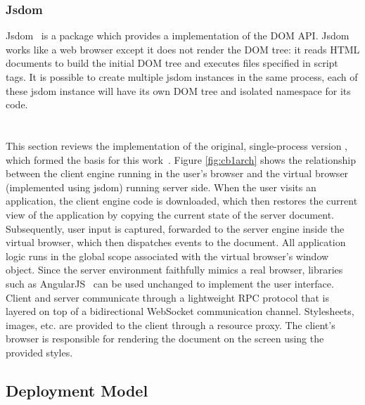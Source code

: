 \subsubsection{Jsdom}


Jsdom~\cite{JSDOM} is a \nodejs package which provides a \js implementation of the
DOM API. %
Jsdom works like a web browser except it does not render the DOM tree:
it reads HTML documents to build the initial DOM tree and executes \js files specified in script tags.
It is possible to create multiple jsdom instances in the same process,
each of these jsdom instance will have its own DOM tree and
isolated namespace for its \js code.


\section{\cb}

\architectureoverview{}

This section reviews the implementation of
the original, single-process version \cb{},
which formed the basis for this work~\cite{mcdaniel2012cloudbrowser}.
Figure \ref{fig:cb1arch} shows the relationship
between the client engine running in the user's browser and the virtual browser 
(implemented using jsdom)
running server side.  When the user visits an application, the client engine
code is downloaded, which then restores the current view of the application by
copying the current state of the server document.  Subsequently, user input
is captured, forwarded to the server engine inside the virtual browser,
which then dispatches events to the document.  All application logic runs
in the global scope associated with the virtual browser's window object.
Since the server environment faithfully mimics a real browser, libraries
such as AngularJS~\cite{hevery2009angular} can be used unchanged to implement 
the user interface.
Client and server communicate through a lightweight RPC protocol that is
layered on top of a bidirectional WebSocket communication channel.
Stylesheets, images, etc. are provided to the client through a resource
proxy.  The client's browser is responsible for rendering the document
on the screen using the provided styles.


\subsection{Deployment Model}
\label{sec:deploymodel}

\appbundlefig{}

